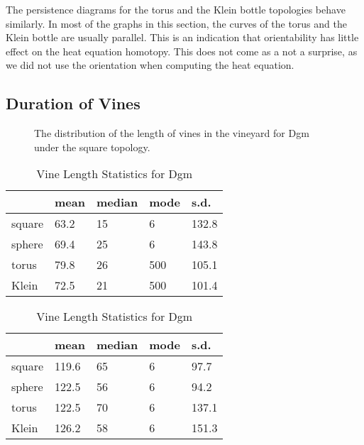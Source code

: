 The persistence diagrams for the torus and the Klein
bottle topologies behave similarly.  In most of the graphs in this section, the
curves of the torus and the Klein bottle are usually parallel.  This is an 
indication that orientability has little effect on the heat equation homotopy.  
This does not come as a not a surprise, as we did not
use the orientation when computing the heat equation.

\subsection{Duration of Vines}
\begin{figure}[hbt]
 \vspace*{0.1in}
 \centering
 \centerline{}
 \caption{The distribution of the length of vines in the vineyard for Dgm
          under the square topology.}
 \label{fig:vine_lengths}
\end{figure}
\begin{table}[h!b!p!]
\caption{Vine Length Statistics for Dgm}
\begin{center} \begin{tabular}{ |l | l | l | l | l | }
    \hline
          & mean & median & mode  & s.d.   \\ \hline\hline
   square & 63.2 & 15     & 6     & 132.8  \\ \hline
   sphere & 69.4 & 25     & 6     & 143.8  \\ \hline
   torus  & 79.8 & 26     & 500   & 105.1  \\ \hline
   Klein  & 72.5 & 21     & 500   & 101.4  \\ 
    \hline
  \end{tabular}
\end{center}\label{table:dgm0}
\end{table}
\begin{table}[h!b!p!]
\caption{Vine Length Statistics for Dgm}
\begin{center} \begin{tabular}{ |l | l | l | l | l | }
    \hline
          & mean  & median & mode & s.d.  \\ \hline\hline
   square & 119.6 & 65     & 6    & 97.7  \\ \hline
   sphere & 122.5 & 56     & 6    & 94.2  \\ \hline
   torus  & 122.5 & 70     & 6    & 137.1 \\ \hline
   Klein  & 126.2 & 58     & 6    & 151.3 \\ 
    \hline
  \end{tabular}
\end{center}\label{table:dgm1}
\end{table}
